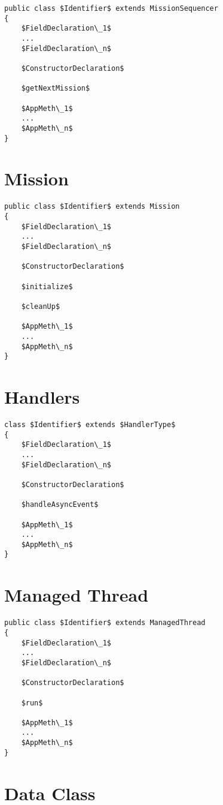 \documentclass[11pt,a4paper]{article}
\begin{document}
\begin{lstlisting}
public class $Identifier$ extends MissionSequencer
{
	$FieldDeclaration\_1$
	...
	$FieldDeclaration\_n$

	$ConstructorDeclaration$

	$getNextMission$

	$AppMeth\_1$
	...
	$AppMeth\_n$
}
\end{lstlisting}



\newpage

\section*{Mission}

\begin{lstlisting}
public class $Identifier$ extends Mission
{
	$FieldDeclaration\_1$
	...
	$FieldDeclaration\_n$

	$ConstructorDeclaration$

	$initialize$

	$cleanUp$

	$AppMeth\_1$
	...
	$AppMeth\_n$
}
\end{lstlisting}

\newpage

\section*{Handlers}

\begin{lstlisting}
class $Identifier$ extends $HandlerType$
{
	$FieldDeclaration\_1$
	...
	$FieldDeclaration\_n$

	$ConstructorDeclaration$

	$handleAsyncEvent$

	$AppMeth\_1$
	...
	$AppMeth\_n$
}
\end{lstlisting}

\newpage

\section*{Managed Thread}

\begin{lstlisting}
public class $Identifier$ extends ManagedThread
{
	$FieldDeclaration\_1$
	...
	$FieldDeclaration\_n$

	$ConstructorDeclaration$

	$run$

	$AppMeth\_1$
	...
	$AppMeth\_n$
}
\end{lstlisting}


\section*{Data Class}


\end{document}
